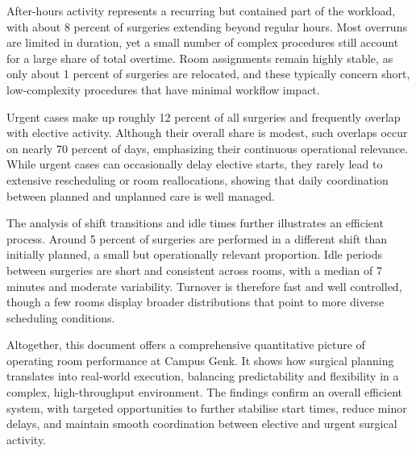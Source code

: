 \documentclass[
]{article}
\begin{document}
After-hours activity represents a recurring but contained part of the
workload, with about 8 percent of surgeries extending beyond regular
hours. Most overruns are limited in duration, yet a small number of
complex procedures still account for a large share of total overtime.
Room assignments remain highly stable, as only about 1 percent of
surgeries are relocated, and these typically concern short,
low-complexity procedures that have minimal workflow impact.

Urgent cases make up roughly 12 percent of all surgeries and frequently
overlap with elective activity. Although their overall share is modest,
such overlaps occur on nearly 70 percent of days, emphasizing their
continuous operational relevance. While urgent cases can occasionally
delay elective starts, they rarely lead to extensive rescheduling or
room reallocations, showing that daily coordination between planned and
unplanned care is well managed.

The analysis of shift transitions and idle times further illustrates an
efficient process. Around 5 percent of surgeries are performed in a
different shift than initially planned, a small but operationally
relevant proportion. Idle periods between surgeries are short and
consistent across rooms, with a median of 7 minutes and moderate
variability. Turnover is therefore fast and well controlled, though a
few rooms display broader distributions that point to more diverse
scheduling conditions.

Altogether, this document offers a comprehensive quantitative picture of
operating room performance at Campus Genk. It shows how surgical
planning translates into real-world execution, balancing predictability
and flexibility in a complex, high-throughput environment. The findings
confirm an overall efficient system, with targeted opportunities to
further stabilise start times, reduce minor delays, and maintain smooth
coordination between elective and urgent surgical activity.
\end{document}
